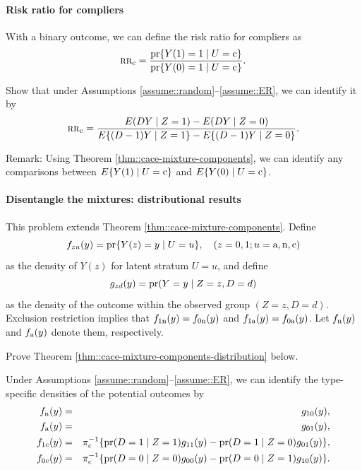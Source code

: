 \paragraph{Risk ratio for compliers}\label{hw::rr-compliers}


With a binary outcome, we can define the risk ratio for compliers as
$$
\textsc{rr}_{\textup{c}} = \frac{  \textup{pr}\{  Y(1) = 1\mid U = \textup{c} \}  }{ \textup{pr}\{  Y(0) = 1\mid U = \textup{c} \}   } .
$$

Show that under Assumptions \ref{assume::random}--\ref{assume::ER}, we can identify it by
$$
\textsc{rr}_{\textup{c}} =  \frac{  E(DY\mid Z=1)  - E(DY\mid Z=0)  }{  E\{  (D-1)Y\mid Z=1 \}   - E\{ (D-1)Y\mid Z=0 \} }.
$$



Remark: Using Theorem \ref{thm::cace-mixture-components}, we can identify any comparisons between $E\{  Y(1) \mid U = \textup{c} \} $ and $E\{  Y(0) \mid U = \textup{c} \} $. 


\paragraph{Disentangle the mixtures: distributional results}\label{hw::disentangle-mixture-distrubution}


This problem extends Theorem \ref{thm::cace-mixture-components}. Define
$$
f_{zu}(y) = \textup{pr}\{  Y(z) = y  \mid U=u \},  \quad  (z=0,1;u=\textup{a}, \textup{n}, \textup{c})
$$
as the density of $Y(z)$ for latent stratum $U=u$, and define 
$$
g_{zd}(y) = \textup{pr}(Y = y\mid Z=z, D=d)
$$
as the density of the outcome within the observed group $(Z=z, D=d)$. 
Exclusion restriction implies that $f_{1\textup{n}}(y) = f_{0\textup{n}} (y) $ and $f_{1\textup{a}}(y) = f_{0\textup{a}}(y) $. Let $f_{\textup{n}}(y)$ and $ f_{\textup{a}} (y) $ denote them, respectively. 



Prove  Theorem \ref{thm::cace-mixture-components-distribution} below.  


 
\begin{theorem}
\label{thm::cace-mixture-components-distribution}
Under Assumptions \ref{assume::random}--\ref{assume::ER}, we can identify the type-specific densities of the potential outcomes by
\begin{eqnarray*}
  f_{\textup{n}}(y) &=& g_{10}(y) ,\\
  f_{\textup{a}} (y) &=& g_{01}(y),\\
f_{1\textup{c}}(y) &=& \pi_{\textup{c}}^{-1} \{   \textup{pr}(D=1\mid Z=1 )g_{11}(y)  -  \textup{pr}(D=1\mid Z=0) g_{01}(y)   \} , \\
f_{0\textup{c}} (y) &=& \pi_{\textup{c}}^{-1} \{  \textup{pr}(D=0\mid Z=0)  g_{00}(y)  -  \textup{pr}(D=0\mid Z=1)  g_{10}(y)    \} . 
\end{eqnarray*}
\end{theorem}



